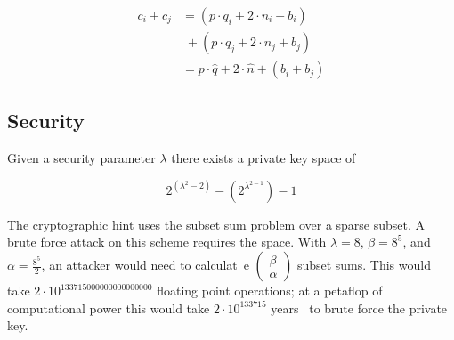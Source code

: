 \documentclass[letterpaper,11pt]{article} %
\begin{document}
\begin{multicols}{2}
\begin{align*}                                                                                                                                                                                                                              
  c_i+ c_j &= \left(p\cdot q_i + 2\cdot n_i + b_i\right)\\&\;+\left(p\cdot q_j + 2\cdot n_j + b_j\right)\\                                                                                                                                  
  &= p\cdot\hat{q} + 2\cdot\hat{n} +\left(b_i+b_j\right)                                                                                                                                                                                    
\end{align*}

\end{multicols}




\subsection*{Security}
Given a security parameter \(\lambda\) there exists a private key space of

\[2^{(\lambda^2-2)} - (2^{\lambda^{2-1}})-1\]

The cryptographic hint uses the subset sum problem over a sparse subset. A brute force attack on this scheme requires the space. With \(\lambda = 8\), \(\beta  = 8^5\), and \(\alpha = \frac{8^5}{2}\), an attacker would need to calculat\
e \(\left(\begin{matrix}\beta\\\alpha\end{matrix}\right)\) subset sums. This would take \(2\cdot 10^{133715000000000000000}\) floating point operations; at a petaflop of computational power this would take \(2\cdot 10^{133715}\) years \
to brute force the private key.
\end{document}
